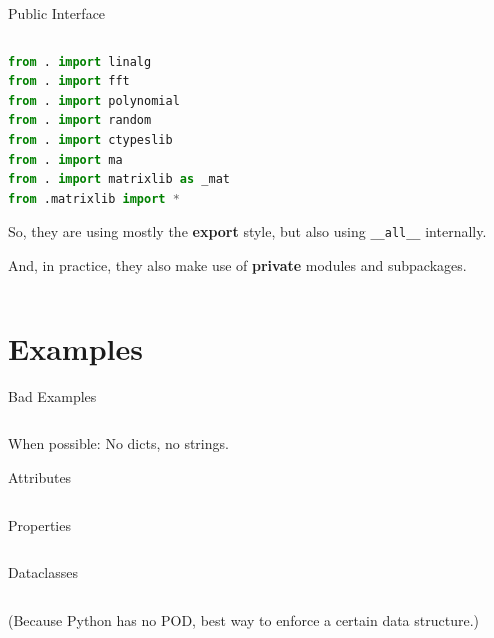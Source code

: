 \documentclass[9pt]{beamer}
\begin{document}
\begin{frame}[fragile]{Public Interface}
\begin{columns}
\begin{column}{0.47\textwidth}
\begin{lstlisting}[language=Python,style=mystyle,firstnumber=140]
from . import linalg
from . import fft
from . import polynomial
from . import random
from . import ctypeslib
from . import ma
from . import matrixlib as _mat
from .matrixlib import *\end{lstlisting}
        So, they are using mostly the \textbf{export} style, but also using
        \texttt{\_\_all\_\_} internally.
        \begin{flushright}
            \footnotesize
            \hspace*{15em}And, in practice, they also make use of
            \textbf{private} modules and subpackages.
        \end{flushright}
        \end{column}
    \end{columns}
\end{frame}

\section{Examples}

\begin{frame}{Bad Examples}
    \begin{columns}
        \begin{column}{0.5\textwidth}
            When possible: No dicts, no strings.

            Attributes

        \end{column}
        \begin{column}{0.5\textwidth}
        \end{column}
    \end{columns}
\end{frame}

\begin{frame}{Properties}
    \begin{columns}
        \begin{column}{0.5\textwidth}
        \end{column}
        \begin{column}{0.5\textwidth}
        \end{column}
    \end{columns}
\end{frame}

\begin{frame}{Dataclasses}
    \begin{columns}
        \begin{column}{0.5\textwidth}
            (Because Python has no POD, best way to enforce a certain
            data structure.)
        \end{column}
        \begin{column}{0.5\textwidth}
        \end{column}
    \end{columns}
\end{frame}
\end{document}
